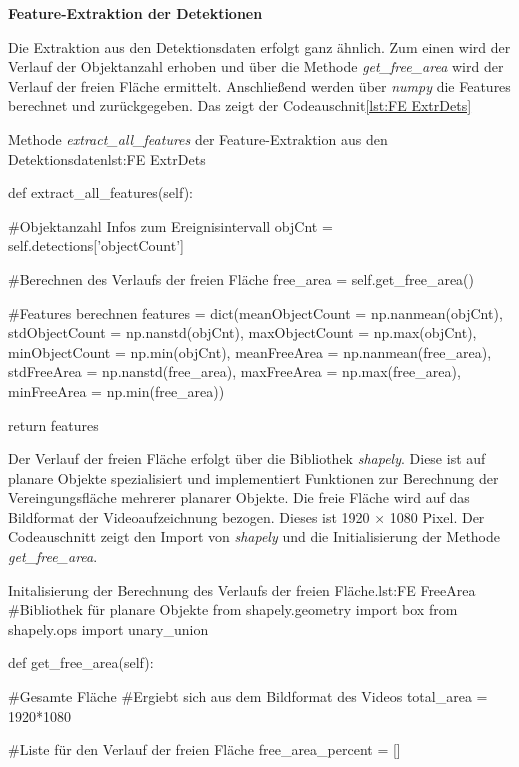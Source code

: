 \dubpar
\textbf{Feature-Extraktion der Detektionen}\par

Die Extraktion aus den Detektionsdaten erfolgt ganz ähnlich. Zum einen wird der Verlauf der Objektanzahl erhoben und über die Methode \textit{get\_free\_area} wird der Verlauf der freien Fläche ermittelt. Anschließend werden über \textit{numpy} die Features berechnet und zurückgegeben. Das zeigt der Codeauschnit\ref{lst:FE ExtrDets}

\begin{pythoncode}{Methode \textit{extract\_all\_features} der Feature-Extraktion aus den Detektionsdaten}{lst:FE ExtrDets}

def extract_all_features(self):
    
    #Objektanzahl Infos zum Ereignisintervall
    objCnt = self.detections['objectCount']

    #Berechnen des Verlaufs der freien Fläche
    free_area = self.get_free_area()

    #Features berechnen
    features = dict(meanObjectCount = np.nanmean(objCnt),
                    stdObjectCount = np.nanstd(objCnt),
                    maxObjectCount = np.max(objCnt),
                    minObjectCount = np.min(objCnt),
                    meanFreeArea = np.nanmean(free_area),
                    stdFreeArea = np.nanstd(free_area),
                    maxFreeArea = np.max(free_area),
                    minFreeArea = np.min(free_area))

    return features

\end{pythoncode}

Der Verlauf der freien Fläche erfolgt über die Bibliothek \textit{shapely}. Diese ist auf planare Objekte spezialisiert und implementiert Funktionen zur Berechnung der Vereingungsfläche mehrerer planarer Objekte. Die freie Fläche wird auf das Bildformat der Videoaufzeichnung bezogen. Dieses ist 1920 × 1080 Pixel.  Der Codeauschnitt zeigt den Import von \textit{shapely} und die Initialisierung der Methode \textit{get\_free\_area}. 

\begin{pythoncode}{Initalisierung der Berechnung des Verlaufs der freien Fläche.}{lst:FE FreeArea}
#Bibliothek für planare Objekte
from shapely.geometry import box
from shapely.ops import unary_union

def get_free_area(self):  
    
    #Gesamte Fläche 
    #Ergiebt sich aus dem Bildformat des Videos
    total_area = 1920*1080

    #Liste für den Verlauf der freien Fläche
    free_area_percent = []

\end{pythoncode}

